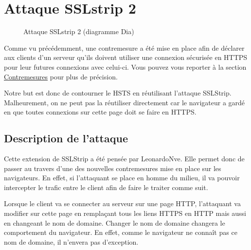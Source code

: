 \chapter{Attaque SSLstrip 2}

\label{sec:sslstrip2}

\begin{figure}[H]
  \caption{Attaque SSLstrip 2 (diagramme Dia)}
\end{figure}

Comme vu précédemment, une contremesure a été mise en place afin de déclarer aux clients d'un serveur qu'ils doivent utiliser une connexion sécurisée en HTTPS pour leur futures connexions avec celui-ci. Vous pouvez vous reporter à la section \hyperref[sec:hsts]{Contremesures} pour plus de précision.

Notre but est donc de contourner le HSTS en réutilisant l'attaque SSLStrip. Malheurement, on ne peut pas la réutiliser directement car le navigateur a gardé en que toutes connexions sur cette page doit se faire en HTTPS.

\section{Description de l'attaque}
Cette extension de SSLStrip a été pensée par LeonardoNve. Elle permet donc de passer au travers d'une des nouvelles contremesures mise en place sur les navigateurs. En effet, si l'attaquant se place en homme du milieu, il va pouvoir intercepter le trafic entre le client afin de faire le traiter comme suit.

Lorsque le client va se connecter au serveur sur une page HTTP, l'attaquant va modifier sur cette page en remplaçant tous les liens HTTPS en HTTP mais aussi en changeant le nom de domaine. Changer le nom de domaine changera le comportement du navigateur. En effet, comme le navigateur ne connaît pas ce nom de domaine, il n'envera pas d'exception.

